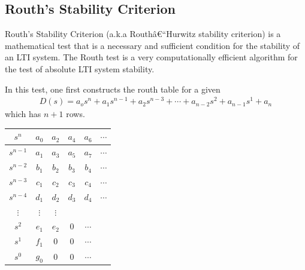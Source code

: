 \documentclass[twoside]{article}
\begin{document}
\subsection{Routh's Stability Criterion} 

Routh's Stability Criterion (a.k.a  Routhâ€“Hurwitz stability criterion)
is a mathematical test that is a necessary and sufficient condition 
for the stability of an LTI system. The Routh test is a very 
computationally efficient algorithm for the test of absolute
LTI system stability. 

In this test, one first constructs the routh table for a given
%
\begin{align*}
D(s) = a_o s^n + a_1 s^{n-1} + a_2 s^{n-3} + \cdots + a_{n-2} s^{2}
+ a_{n-1} s^{1} + a_n 
\end{align*}  
%
which has $n+1$ rows. 
%
\begin{table}[h]
\begin{center}
\begin{tabular}{|c || c || c c c c |}
\hline
$s^n$ & $a_0$ & $a_2$ & $a_4$ & $a_6$ & $\cdots$ 
\\ \hline
$s^{n-1}$ & $a_1$ & $a_3$ & $a_5$ & $a_7$ & $\cdots$ 
\\ \hline
$s^{n-2}$ & $b_1$ & $b_2$ & $b_3$ & $b_4$ & $\cdots$ 
\\ \hline
$s^{n-3}$ & $c_1$ & $c_2$ & $c_3$ & $c_4$ & $\cdots$ 
\\ \hline
$s^{n-4}$ & $d_1$ & $d_2$ & $d_3$ & $d_4$ & $\cdots$ 
\\ \hline
$\vdots$ & $\vdots$ & $\vdots$ &  & & 
\\ \hline
$s^{2}$ & $e_1$ & $e_2$ & $0$ & $\cdots$  & 
\\ \hline
$s^{1}$ & $f_1$ & $0$ & $0$ & $\cdots$  & 
\\ \hline
$s^{0}$ & $g_0$ & $0$ & $0$ & $\cdots$  & 
\\ \hline
\end{tabular}
\end{center}
\end{table}
\end{document}
